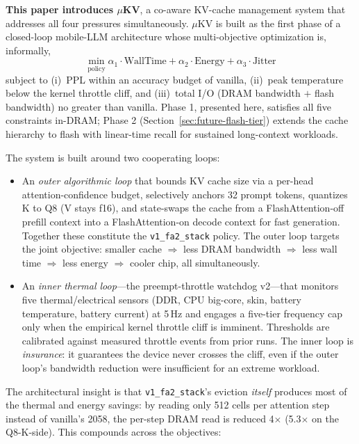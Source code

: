 \documentclass[sigconf, anonymous=false, screen=true]{acmart}
\begin{document}
\textbf{This paper introduces \textsc{$\mu$KV}}, a co-aware KV-cache management system that addresses all four pressures simultaneously. \textsc{$\mu$KV} is built as the first phase of a closed-loop mobile-LLM architecture whose multi-objective optimization is, informally,
\[
\min_{\text{policy}} \alpha_1 \cdot \text{WallTime} + \alpha_2 \cdot \text{Energy} + \alpha_3 \cdot \text{Jitter}
\]
subject to (i)~PPL within an accuracy budget of vanilla, (ii)~peak temperature below the kernel throttle cliff, and (iii)~total I/O (DRAM bandwidth $+$ flash bandwidth) no greater than vanilla. Phase 1, presented here, satisfies all five constraints in-DRAM; Phase 2 (Section~\ref{sec:future-flash-tier}) extends the cache hierarchy to flash with linear-time recall for sustained long-context workloads.

The system is built around two cooperating loops:

\begin{itemize}
\item An \emph{outer algorithmic loop} that bounds KV cache size via a per-head attention-confidence budget, selectively anchors 32 prompt tokens, quantizes K to Q8 (V stays f16), and state-swaps the cache from a FlashAttention-off prefill context into a FlashAttention-on decode context for fast generation. Together these constitute the \texttt{v1\_fa2\_stack} policy. The outer loop targets the joint objective: smaller cache $\Rightarrow$ less DRAM bandwidth $\Rightarrow$ less wall time $\Rightarrow$ less energy $\Rightarrow$ cooler chip, all simultaneously.
\item An \emph{inner thermal loop}---the preempt-throttle watchdog v2---that monitors five thermal/electrical sensors (DDR, CPU big-core, skin, battery temperature, battery current) at 5\,Hz and engages a five-tier frequency cap only when the empirical kernel throttle cliff is imminent. Thresholds are calibrated against measured throttle events from prior runs. The inner loop is \emph{insurance}: it guarantees the device never crosses the cliff, even if the outer loop's bandwidth reduction were insufficient for an extreme workload.
\end{itemize}

The architectural insight is that \texttt{v1\_fa2\_stack}'s eviction \emph{itself} produces most of the thermal and energy savings: by reading only 512 cells per attention step instead of vanilla's 2058, the per-step DRAM read is reduced 4$\times$ (5.3$\times$ on the Q8-K-side). This compounds across the objectives:
\end{document}
